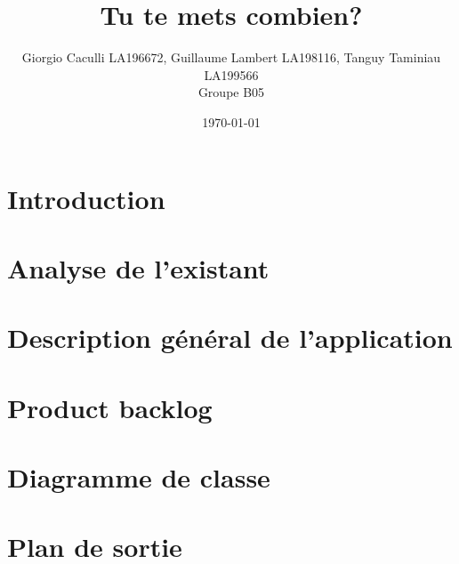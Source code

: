 \documentclass[10pt]{article}
\title{Tu te mets combien?}
\author{Giorgio Caculli LA196672, Guillaume Lambert LA198116, Tanguy Taminiau LA199566 \\ Groupe B05}
\date{\today}
\begin{document}
\maketitle

\newpage
\tableofcontents

\newpage
\section*{Introduction}
\label{sec:intro}


\newpage
\section{Analyse de l'existant}


\section{Description général de l'application}


\section{Product backlog}


\section{Diagramme de classe}



\section{Plan de sortie}


\newpage
\printglossary
\end{document}
